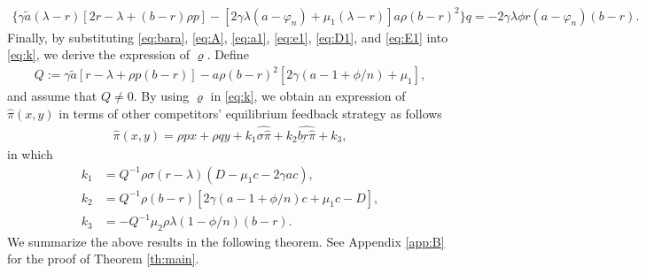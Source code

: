 \documentclass[11pt]{article}
\numberwithin{equation}{section}
\begin{document}
	\begin{align}\label{eq:q2}
		\{\gamma \tilde{a}(\lambda-r)[2r-\lambda+(b-r)\rho p]-[2\gamma\lambda(a-\varphi_n)+\mu_1(\lambda-r)]a\rho(b-r)^2\}q=-2\gamma\lambda\phi r(a-\varphi_n)(b-r).
	\end{align}
Finally, by substituting \eqref{eq:bara}, \eqref{eq:A}, \eqref{eq:a1}, \eqref{eq:e1}, \eqref{eq:D1}, and \eqref{eq:E1} into \eqref{eq:k}, we derive the expression of \(\varrho\).
Define
	\begin{align}\label{eq:Qi}
	Q :=\gamma \tilde{a}[r-\lambda+\rho p (b - r)]-a \rho(b-r)^2[2\gamma(a-1+\phi/n)+\mu_{1}],
	\end{align}
	and assume that \(Q \neq 0\). By using \(\varrho\) in \eqref{eq:k}, we obtain an expression of \(\widehat{\pi}(x, y)\) in terms of other competitors' equilibrium  feedback  strategy as follows
	\begin{align}\label{eq:pi_i}
		\widehat{\pi}(x, y)= \rho p x + \rho q y + k_{1} \widehat{\sigma\widehat{\pi}} + k_{2}\widehat{\underline{br}\widehat{\pi}}+k_{3},
	\end{align}
	in which
	\begin{align}	
k_{1}&=Q^{-1}\rho\sigma(r-\lambda)(D-\mu_{1}c-2\gamma a c),\label{eq:k1}\\
k_{2}&=Q^{-1}\rho(b-r)[2\gamma(a-1+\phi/n)c+\mu_{1}c -D],\label{eq:k2}\\
k_{3}&=-Q^{-1}\mu_{2}\rho\lambda(1-\phi/n)(b-r).\label{eq:k3}
	\end{align}
We summarize the above results in the following theorem. See Appendix \ref{app:B} for the proof of Theorem \ref{th:main}.
\end{document}
